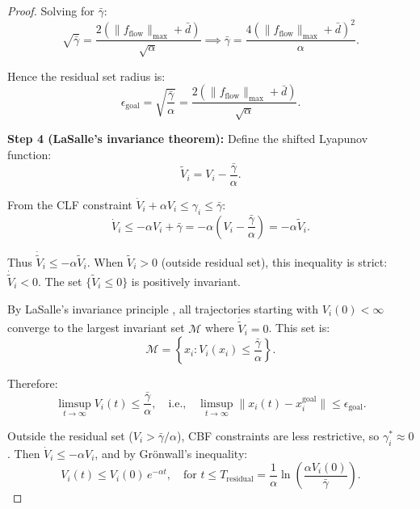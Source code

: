 \begin{proof}
Solving for $\bar{\gamma}$:
\begin{equation}
\sqrt{\bar{\gamma}} = \frac{2(\|f_{\mathrm{flow}}\|_{\max}+\bar{d})}{\sqrt{\alpha}} \implies \bar{\gamma} = \frac{4(\|f_{\mathrm{flow}}\|_{\max}+\bar{d})^2}{\alpha}.
\label{eq:gamma-solution}
\end{equation}

Hence the residual set radius is:
\begin{equation}
\epsilon_{\mathrm{goal}} = \sqrt{\frac{\bar{\gamma}}{\alpha}} = \frac{2(\|f_{\mathrm{flow}}\|_{\max}+\bar{d})}{\sqrt{\alpha}}.
\label{eq:residual-radius}
\end{equation}

\medskip
\noindent\textbf{Step 4 (LaSalle's invariance theorem):}
Define the shifted Lyapunov function:
\begin{equation}
\tilde{V}_i = V_i - \frac{\bar{\gamma}}{\alpha}.
\label{eq:shifted-lyapunov}
\end{equation}

From the CLF constraint $\dot{V}_i+\alpha V_i\le\gamma_i\le\bar{\gamma}$:
\begin{equation}
\dot{V}_i \le -\alpha V_i + \bar{\gamma} = -\alpha\left(V_i-\frac{\bar{\gamma}}{\alpha}\right) = -\alpha\tilde{V}_i.
\label{eq:shifted-derivative}
\end{equation}

Thus $\dot{\tilde{V}}_i\le -\alpha\tilde{V}_i$. When $\tilde{V}_i>0$ (outside residual set), this inequality is strict: $\dot{\tilde{V}}_i<0$. The set $\{\tilde{V}_i\le 0\}$ is positively invariant.

By LaSalle's invariance principle \cite{khalil2002}, all trajectories starting with $V_i(0)<\infty$ converge to the largest invariant set $\mathcal{M}$ where $\dot{\tilde{V}}_i=0$. This set is:
\begin{equation}
\mathcal{M} = \left\{x_i : V_i(x_i)\le\frac{\bar{\gamma}}{\alpha}\right\}.
\label{eq:invariant-set}
\end{equation}

Therefore:
\begin{equation}
\limsup_{t\to\infty} V_i(t) \le \frac{\bar{\gamma}}{\alpha}, \quad \text{i.e.,} \quad \limsup_{t\to\infty}\|x_i(t)-x_i^{\mathrm{goal}}\| \le \epsilon_{\mathrm{goal}}.
\label{eq:convergence-result}
\end{equation}

Outside the residual set ($V_i>\bar{\gamma}/\alpha$), CBF constraints are less restrictive, so $\gamma_i^*\approx 0$. Then $\dot{V}_i\le -\alpha V_i$, and by Grönwall's inequality:
\begin{equation}
V_i(t) \le V_i(0)\,e^{-\alpha t}, \quad \text{for }t\le T_{\mathrm{residual}}=\frac{1}{\alpha}\ln\left(\frac{\alpha V_i(0)}{\bar{\gamma}}\right).
\label{eq:exponential-convergence}
\end{equation}
\end{proof}


